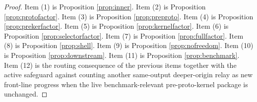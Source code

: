 \documentclass[11pt]{article}
\begin{document}
\begin{proof}
Item (1) is Proposition \ref{prop:inner}. Item (2) is Proposition \ref{prop:protofactor}. Item (3) is Proposition \ref{prop:preproto}. Item (4) is Proposition \ref{prop:prekerfactor}. Item (5) is Proposition \ref{prop:kernelfactor}. Item (6) is Proposition \ref{prop:selectorfactor}. Item (7) is Proposition \ref{prop:fullfactor}. Item (8) is Proposition \ref{prop:shell}. Item (9) is Proposition \ref{prop:nofreedom}. Item (10) is Proposition \ref{prop:downstream}. Item (11) is Proposition \ref{prop:benchmark}. Item (12) is the routing consequence of the previous items together with the active safeguard against counting another same-output deeper-origin relay as new front-line progress when the live benchmark-relevant pre-proto-kernel package is unchanged.
\end{proof}
\end{document}
